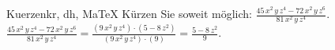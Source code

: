 \begin{MAufgabe}{Kuerzen}{kr, dh, MaTeX}
K\"urzen Sie soweit m\"oglich: $\frac{45\, x^2\, y\, z^4 - 72\, x^2\, y\, z^6}{81\, x^2\, y\, z^4}$.\\ 
\ifLsg\MLoesung
\quad $\frac{45\, x^2\, y\, z^4 - 72\, x^2\, y\, z^6}{81\, x^2\, y\, z^4}=\frac{(9\, x^2\, y\, z^4)\cdot(5 - 8\, z^2)}{(9\, x^2\, y\, z^4)\cdot(9)}=\frac{5 - 8\, z^2}{9}$.\else\relax\fi
 \end{MAufgabe}